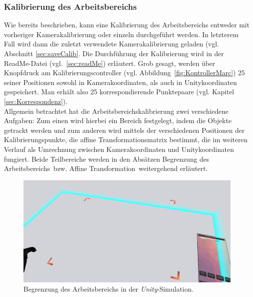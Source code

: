 \subsubsection{Kalibrierung des Arbeitsbereichs}\label{sec:planeCalib} 
Wie bereits beschrieben, kann eine Kalibrierung des Arbeitsbereichs entweder mit vorheriger Kamerakalibrierung oder einzeln durchgeführt werden. In letzterem Fall wird dann die zuletzt verwendete Kamerakalibrierung geladen (vgl. Abschnitt \ref{sec:saveCalib}. Die Durchführung der Kalibrierung wird in der ReadMe-Datei (vgl.~\ref{sec:readMe}) erläutert. Grob gesagt, werden über Knopfdruck am Kalibrierungscontroller (vgl. Abbildung~\ref{fig:KontrollerMarc}) 25 seiner Positionen sowohl in Kamerakoordinaten, als auch in Unitykoordinaten gespeichert. Man erhält also 25 korrespondierende Punktepaare (vgl. Kapitel \ref{sec:Korrespondenz}).\\
Allgemein betrachtet hat die Arbeitsbereichskalibrierung zwei verschiedene Aufgaben: Zum einen wird hierbei ein Bereich festgelegt, indem die Objekte getrackt werden und zum anderen wird mittels der verschiedenen Positionen der Kalibrierungspunkte, die affine Transformationsmatrix bestimmt, die im weiteren Verlauf als Umrechnung zwischen Kamerakoordinaten und Unitykoordinaten fungiert. Beide Teilbereiche werden in den Absätzen \grqq Begrenzung des Arbeitsbereichs\grqq ~bzw. \grqq Affine Transformation\grqq ~weitergehend erläutert.

\begin{figure}
	\centering
	\includegraphics[width=\textwidth]{Bilder/Arbeitsbereich.png}
	\caption{Begrenzung des Arbeitsbereichs in der \emph{Unity}-Simulation.}
	\label{fig:begrenzungArbeitsbereich}
\end{figure}

